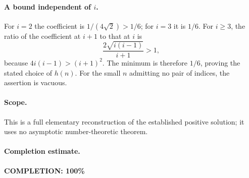 \paragraph{A bound independent of \(i\).}
For \(i=2\) the coefficient is \(1/(4\sqrt2)>1/6\);
for \(i=3\) it is \(1/6\).
For \(i\geq3\), the ratio of the coefficient at \(i+1\) to that
at \(i\) is
\[
 \frac{2\sqrt{i(i-1)}}{i+1}>1,
\]
because \(4i(i-1)>(i+1)^2\).
The minimum is therefore \(1/6\), proving the stated choice of
\(h(n)\). For the small \(n\) admitting no pair of indices, the
assertion is vacuous.

\paragraph{Scope.}
This is a full elementary reconstruction of the established
positive solution; it uses no asymptotic number-theoretic theorem.

\paragraph{Completion estimate.}
\textbf{COMPLETION: 100\%}
